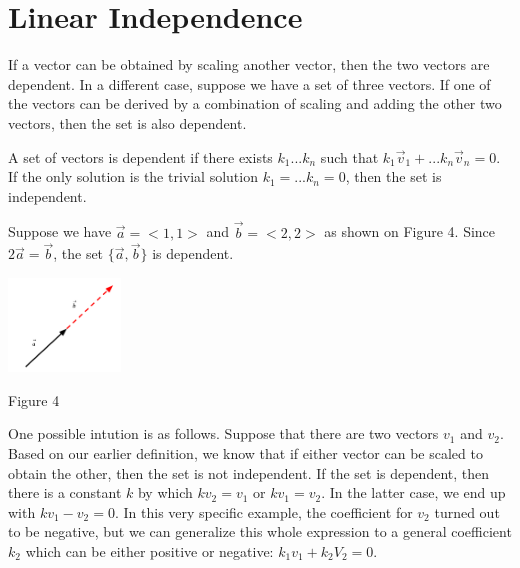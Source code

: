 \documentclass{article}
\begin{document}
\section{Linear Independence}
\par\noindent If a vector can be obtained by scaling another vector, then the two vectors are dependent. In a different case, suppose we have a set of three vectors. If one of the vectors can be derived by a combination of scaling and adding the other two vectors, then the set is also dependent. 
\newline
\par \noindent A set of vectors is dependent if there exists \( k_1 ... k_n\) such that \(k_1 \vec v_1 + ... k_n \vec v_n = 0\). If the only solution is the trivial solution \(k_1 = ... k_n = 0\), then the set is independent. 
\newline
\begin{minipage}[c]{.5\linewidth}
	\par \noindent Suppose we have \( \vec a = <1,1>\) and \( \vec b = <2,2>\) as shown on Figure 4. Since \( 2\vec a = \vec b\), the set \( \{ \vec a, \vec b\}\) is dependent.
\end{minipage}%
\begin{minipage}[c]{.5\linewidth}
	\begin{center}
		\includegraphics[width=3cm]{linear-combo.png}
	\end{center}
	\begin{center}
		Figure 4
	\end{center}
\end{minipage}
\newline
\par\noindent One possible intution is as follows. Suppose that there are two vectors \(v_1\) and \(v_2\). Based on our earlier definition, we know that if either vector can be scaled to obtain the other, then the set is not independent. If the set is dependent, then there is a constant \(k\) by which \(kv_2 = v_1\) or \(kv_1 = v_2\). In the latter case, we end up with \(kv_1 - v_2 = 0\). In this very specific example, the coefficient for \(v_2\) turned out to be negative, but we can generalize this whole expression to a general coefficient \(k_2\) which can be either positive or negative: \(k_1v_1 + k_2V_2 = 0\).
\end{document}
